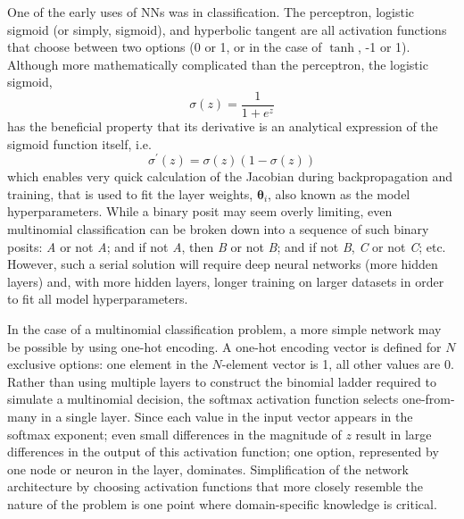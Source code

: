 One of the early uses of NNs was in classification. The perceptron, logistic sigmoid (or simply, sigmoid), and hyperbolic tangent are all activation functions that choose between two options (0 or 1, or in the case of $\tanh$, -1 or 1). Although more mathematically complicated than the perceptron, the logistic sigmoid,
\[
	\sigma(z) = \frac{1}{1 + e^z}
\]
has the beneficial property that its derivative is an analytical expression of the sigmoid function itself, i.e.
\[
	\sigma^\prime(z) = \sigma(z) \left( 1 - \sigma(z) \right)
\]
which enables very quick calculation of the Jacobian during backpropagation and training, that is used to fit the layer weights, $\boldsymbol \theta_i$, also known as the model hyperparameters. While a binary posit may seem overly limiting, even multinomial classification can be broken down into a sequence of such binary posits: \emph{A} or not \emph{A}; and if not \emph{A}, then \emph{B} or not \emph{B}; and if not \emph{B}, \emph{C} or not \emph{C}; etc. However, such a serial solution will require deep neural networks (more hidden layers) and, with more hidden layers, longer training on larger datasets in order to %
fit all model hyperparameters.

In the case of a multinomial classification problem, a more simple network may be possible by using one-hot encoding. A one-hot encoding vector is defined for $N$ exclusive options: one element in the $N$-element vector is 1, all other values are 0. Rather than using multiple layers to construct the binomial ladder required to simulate a multinomial decision, the softmax activation function selects one-from-many in a single layer. Since each value in the input vector appears in the softmax exponent; even small differences in the magnitude of $z$ result in large differences in the output of this activation function; one option, represented by one node or neuron in the layer, dominates. Simplification of the network architecture by choosing activation functions that more closely resemble the nature of the problem is one point where domain-specific knowledge is critical.

